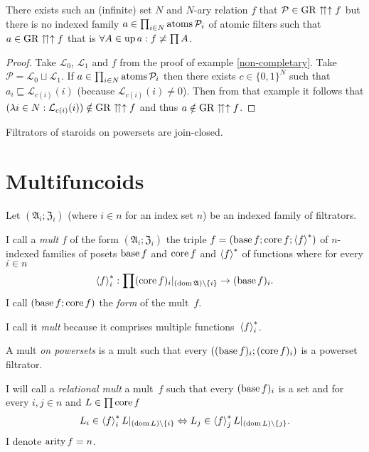 \begin{example}\label{no-intrs}
There exists such an (infinite) set $N$ and $N$-ary relation $f$
that $\mathcal{P}\in\operatorname{GR}\upuparrows\uparrow f$ but there is no indexed family
$a\in\prod_{i\in N}\operatorname{atoms}\mathcal{P}_{i}$ of atomic filters such
that $a\in\operatorname{GR}\upuparrows\uparrow f$ that is $\forall A\in\operatorname{up} a:f\not\asymp\prod A$.\end{example}
\begin{proof}
Take $\mathcal{L}_{0}$, $\mathcal{L}_{1}$ and $f$ from the proof
of example \ref{non-completary}. Take $\mathcal{P}=\mathcal{L}_{0}\sqcup\mathcal{L}_{1}$.
If $a\in\prod_{i\in N}\operatorname{atoms}\mathcal{P}_{i}$ then there exists $c\in\{0,1\}^{N}$
such that $a_{i}\sqsubseteq\mathcal{L}_{c(i)}(i)$ (because $\mathcal{L}_{c(i)}(i)\neq0$).
Then from that example it follows that $(\lambda i\in N:\mathcal{L}_{c(i)}(i))\notin\operatorname{GR}\upuparrows\uparrow f$
and thus $a\notin\operatorname{GR}\upuparrows\uparrow f$.\end{proof}
\begin{conjecture}
Filtrators of staroids on powersets are join-closed.
\end{conjecture}

\section{Multifuncoids}
\begin{defn}
Let $(\mathfrak{A}_{i};\mathfrak{Z}_{i})$ (where $i\in n$
for an index set $n$) be an indexed family of filtrators.

I call a \emph{mult} $f$ of the form $(\mathfrak{A}_{i};\mathfrak{Z}_{i})$
the triple $f=(\operatorname{base} f;\operatorname{core} f;\left\langle f\right\rangle ^{\ast})$ of $n$-indexed families
of posets $\operatorname{base} f$ and $\operatorname{core} f$ and $\left\langle f\right\rangle ^{\ast}$ of functions
where for every $i\in n$ 
\[
\left\langle f\right\rangle ^{\ast}_{i}:\prod(\operatorname{core} f)_{i}|_{(\operatorname{dom}\mathfrak{A})\setminus\{i\}}\rightarrow(\operatorname{base} f)_{i}.
\]
I call $(\operatorname{base} f;\operatorname{core} f)$ the \emph{form} of the mult~$f$.\end{defn}
\begin{rem}
I call it \emph{mult} because it comprises multiple functions~$\left\langle f\right\rangle ^{\ast}_{i}$.
\end{rem}

\begin{defn}
A mult \emph{on powersets} is a mult such
that every $((\operatorname{base} f)_{i};(\operatorname{core} f)_{i})$ is a powerset filtrator.
\end{defn}

\begin{defn}
I will call a \emph{relational mult} a mult~$f$
such that every $(\operatorname{base} f)_{i}$ is a set and for every $i,j\in n$
and $L\in\prod\operatorname{core} f$ 
\[
L_{i}\in\left\langle f\right\rangle ^{\ast}_{i}L|_{(\operatorname{dom} L)\setminus\{i\}}\Leftrightarrow L_{j}\in\left\langle f\right\rangle ^{\ast}_{j}L|_{(\operatorname{dom} L)\setminus\{j\}}.
\]
I denote $\operatorname{arity} f=n$.
\end{defn}

